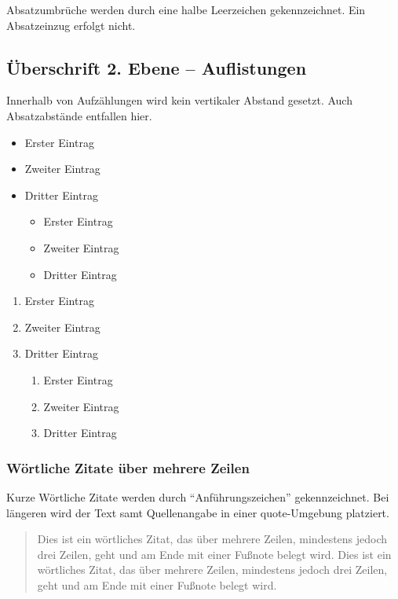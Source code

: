Absatzumbrüche werden durch eine halbe Leerzeichen gekennzeichnet. Ein Absatzeinzug erfolgt nicht. 

\blindtext

\subsection{Überschrift 2. Ebene – Auflistungen}

Innerhalb von Aufzählungen wird kein vertikaler Abstand gesetzt. Auch Absatzabstände entfallen hier.

\begin{itemize}
	\item Erster Eintrag
	\item Zweiter Eintrag
	\item Dritter Eintrag
	\begin{itemize}
		\item Erster Eintrag
		\item Zweiter Eintrag
		\item Dritter Eintrag
	\end{itemize}
\end{itemize}

\begin{enumerate}
	\item Erster Eintrag
	\item Zweiter Eintrag
	\item Dritter Eintrag
	\begin{enumerate}
		\item Erster Eintrag
		\item Zweiter Eintrag
		\item Dritter Eintrag
	\end{enumerate}
\end{enumerate}

\blindtext
\subsubsection{Wörtliche Zitate über mehrere Zeilen}

Kurze Wörtliche Zitate werden durch \enquote{Anführungszeichen} gekennzeichnet. Bei längeren wird der Text samt Quellenangabe in einer quote-Umgebung platziert.

\begin{quote}
	Dies ist ein wörtliches Zitat, das über mehrere Zeilen, mindestens jedoch drei
	Zeilen, geht und am Ende mit einer Fußnote belegt wird. Dies ist ein wörtliches
	Zitat, das über mehrere Zeilen, mindestens jedoch drei Zeilen, geht und am Ende
	mit einer Fußnote belegt wird.\autocite{test.2020}
\end{quote}

